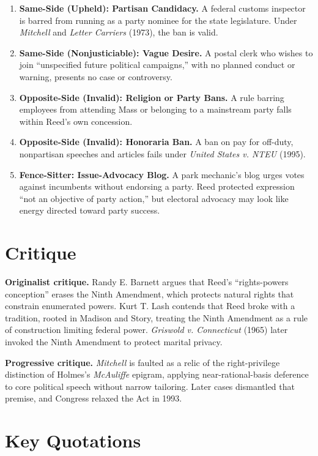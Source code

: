 \documentclass[12pt]{article}
\begin{document}
\begin{enumerate}
\item \textbf{Same-Side (Upheld): Partisan Candidacy.} A federal customs inspector is barred from running as a party nominee for the state legislature. Under \textit{Mitchell} and \textit{Letter Carriers} (1973), the ban is valid.
\item \textbf{Same-Side (Nonjusticiable): Vague Desire.} A postal clerk who wishes to join ``unspecified future political campaigns,'' with no planned conduct or warning, presents no case or controversy.
\item \textbf{Opposite-Side (Invalid): Religion or Party Bans.} A rule barring employees from attending Mass or belonging to a mainstream party falls within Reed's own concession.
\item \textbf{Opposite-Side (Invalid): Honoraria Ban.} A ban on pay for off-duty, nonpartisan speeches and articles fails under \textit{United States v. NTEU} (1995).
\item \textbf{Fence-Sitter: Issue-Advocacy Blog.} A park mechanic's blog urges votes against incumbents without endorsing a party. Reed protected expression ``not an objective of party action,'' but electoral advocacy may look like energy directed toward party success.
\end{enumerate}

\section{Critique}

\textbf{Originalist critique.} Randy E. Barnett argues that Reed's ``rights-powers conception'' erases the Ninth Amendment, which protects natural rights that constrain enumerated powers. Kurt T. Lash contends that Reed broke with a tradition, rooted in Madison and Story, treating the Ninth Amendment as a rule of construction limiting federal power. \textit{Griswold v. Connecticut} (1965) later invoked the Ninth Amendment to protect marital privacy.

\textbf{Progressive critique.} \textit{Mitchell} is faulted as a relic of the right-privilege distinction of Holmes's \textit{McAuliffe} epigram, applying near-rational-basis deference to core political speech without narrow tailoring. Later cases dismantled that premise, and Congress relaxed the Act in 1993.

\section{Key Quotations}
\end{document}
